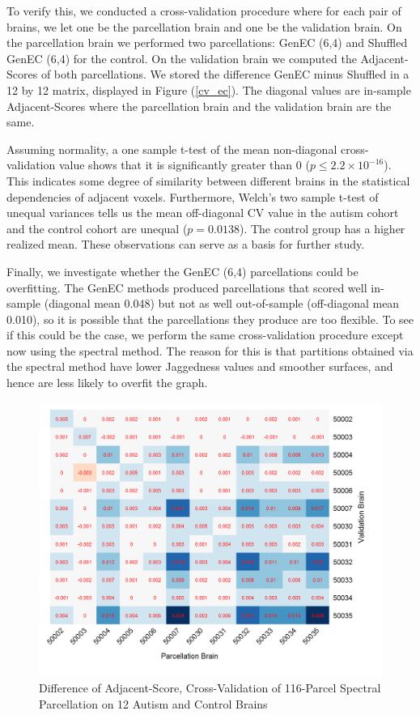 To verify this, we conducted a cross-validation procedure where
for each pair of brains, we let one be the parcellation brain and one
be the validation brain. On the parcellation brain we performed two
parcellations: GenEC (6,4) and Shuffled GenEC (6,4) for the control.
On the validation brain we computed the Adjacent-Scores of both
parcellations. We stored the difference GenEC minus Shuffled in a
12 by 12 matrix, displayed in Figure (\ref{cv_ec}). The diagonal values
are in-sample Adjacent-Scores where the parcellation brain and the
validation brain are the same.

Assuming normality, a one sample t-test of the mean non-diagonal
cross-validation value shows that it is significantly greater than 0
($p \leq 2.2 \times 10^{-16}$). This indicates some degree of similarity
between different brains in the statistical dependencies of adjacent
voxels. Furthermore, Welch's two sample t-test of unequal variances
tells us the mean off-diagonal CV value in the autism cohort and the
control cohort are unequal ($p = 0.0138$). The control group has a
higher realized mean. These observations can serve as a basis for
further study.

Finally, we investigate whether the GenEC (6,4) parcellations could be
overfitting. The GenEC methods produced parcellations that scored well
in-sample (diagonal mean 0.048) but not as well out-of-sample
(off-diagonal mean 0.010), so it is possible that the parcellations
they produce are too flexible. To see if this could be the case, we
perform the same cross-validation procedure except now using the
spectral method. The reason for this is that partitions obtained via the
spectral method have lower Jaggedness values and smoother surfaces,
and hence are less likely to overfit the graph.

\begin{figure}
\caption{Difference of Adjacent-Score, Cross-Validation of
116-Parcel Spectral Parcellation on 12 Autism and Control Brains}
\label{cv_sp}
\includegraphics[scale = 1]{figs/8_cv_sp.png}
\end{figure}

